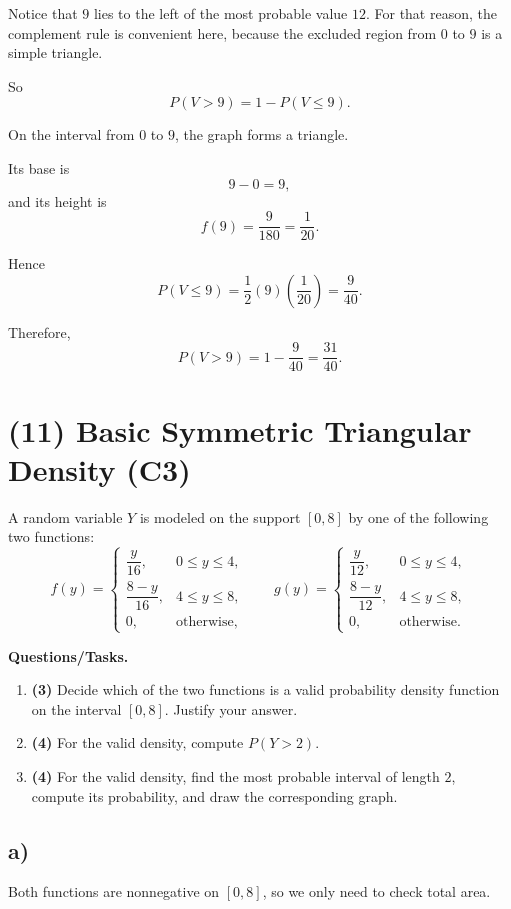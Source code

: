 Notice that $9$ lies to the left of the most probable value $12$. For that reason, the complement rule is convenient here, because the excluded region from $0$ to $9$ is a simple triangle.

So
\[
P(V>9)=1-P(V\le 9).
\]

On the interval from $0$ to $9$, the graph forms a triangle.

Its base is
\[
9-0=9,
\]
and its height is
\[
f(9)=\frac{9}{180}=\frac{1}{20}.
\]

Hence
\[
P(V\le 9)=\frac12(9)\left(\frac{1}{20}\right)=\frac{9}{40}.
\]

Therefore,
\[
P(V>9)=1-\frac{9}{40}=\frac{31}{40}.
\]

	

\section{(11) Basic Symmetric Triangular Density (C3)}


A random variable $Y$ is modeled on the support $[0,8]$ by one of the following two functions:
\[
f(y)=\begin{cases}
	\dfrac{y}{16}, & 0\le y\le 4,\\
	\dfrac{8-y}{16}, & 4\le y\le 8,\\
	0, & \text{otherwise,}
\end{cases}
\qquad
g(y)=\begin{cases}
	\dfrac{y}{12}, & 0\le y\le 4,\\
	\dfrac{8-y}{12}, & 4\le y\le 8,\\
	0, & \text{otherwise.}
\end{cases}
\]

\textbf{Questions/Tasks.}
\begin{enumerate}[label=(\alph*)]
	\item \textbf{(3)} Decide which of the two functions is a valid probability density function on the interval $[0,8]$. Justify your answer.
	\item \textbf{(4)} For the valid density, compute $P(Y>2)$.
	\item \textbf{(4)} For the valid density, find the most probable interval of length $2$, compute its probability, and draw the corresponding graph.
\end{enumerate}

\subsection*{a)}
Both functions are nonnegative on $[0,8]$, so we only need to check total area.

